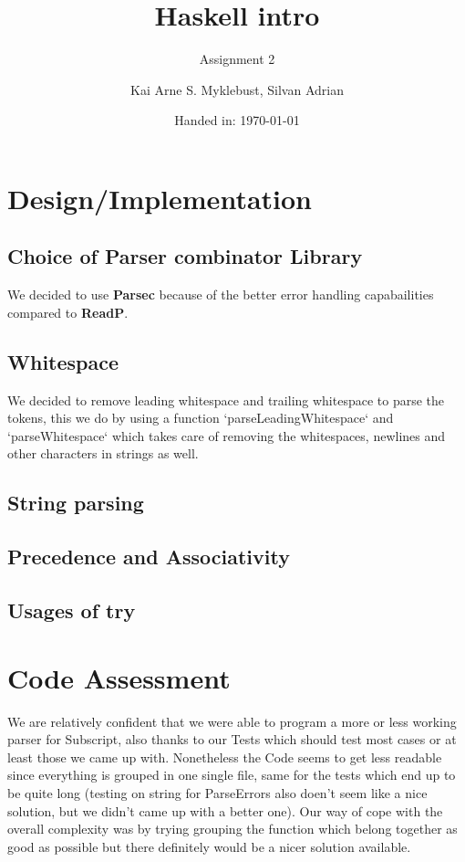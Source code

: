 \documentclass[12pt,a4paper]{article}
\begin{document}
\title{Haskell intro}
\subtitle{Assignment 2}

\author{Kai Arne S. Myklebust, Silvan Adrian}
\date{Handed in: \today}
	
\maketitle
\tableofcontents

\section{Design/Implementation}

\subsection{Choice of Parser combinator Library}
We decided to use \textbf{Parsec} because of the better error handling capabailities compared to \textbf{ReadP}.

\subsection{Whitespace}
We decided to remove leading whitespace and trailing whitespace to parse the tokens, this we do by using a function `parseLeadingWhitespace` and `parseWhitespace` which takes care of removing the whitespaces, newlines and other characters in strings as well.

\subsection{String parsing}


\subsection{Precedence and Associativity}

\subsection{Usages of try}

\section{Code Assessment}

We are relatively confident that we were able to program a more or less working parser for Subscript, also thanks to our Tests which should test most cases or at least those we came up with.
Nonetheless the Code seems to get less readable since everything is grouped in one single file, same for the tests which end up to be quite long (testing on string for ParseErrors also doen't seem like a nice solution, but we didn't came up with a better one).
Our way of cope with the overall complexity was by trying grouping the function which belong together as good as possible but there definitely would be a nicer solution available.
\end{document}
